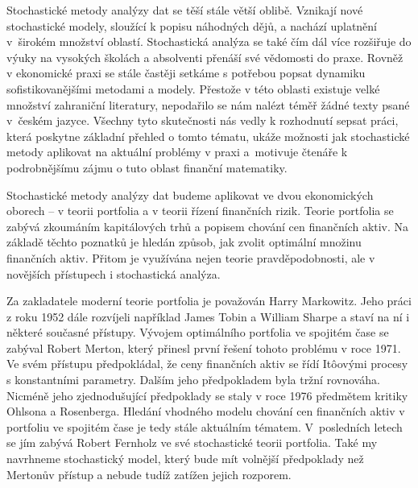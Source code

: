 \documentclass[a4paper,12pt]{report}
\theoremstyle{definition} \newtheorem{definice}[veta]{Definice}
\theoremstyle{remark}
\begin{document}

Stochastické metody analýzy dat se těší stále větší oblibě.
Vznikají nové stochastické modely, sloužící k popisu náhodných dějů, a nachází uplatnění v~širokém množství oblastí.
Stochastická analýza se také čím dál více rozšiřuje do výuky na vysokých školách a absolventi přenáší své vědomosti do praxe.
Rovněž v ekonomické praxi se stále častěji setkáme s potřebou popsat dynamiku sofistikovanějšími metodami a modely.
Přestože v této oblasti existuje velké množství zahraniční literatury, nepodařilo se nám nalézt téměř žádné texty psané v~českém jazyce.
Všechny tyto skutečnosti nás vedly k rozhodnutí sepsat práci, která poskytne základní přehled o tomto tématu, ukáže možnosti jak stochastické metody aplikovat na aktuální problémy v praxi a~motivuje čtenáře k podrobnějšímu zájmu o tuto oblast finanční matematiky.

Stochastické metody analýzy dat budeme aplikovat ve dvou ekonomických oborech -- v teorii portfolia a v teorii řízení finančních rizik. 
Teorie portfolia se zabývá zkoumáním kapitálových trhů a popisem chování cen finančních aktiv.
Na základě těchto poznatků je hledán způsob, jak zvolit optimální množinu finančních aktiv.
Přitom je využívána nejen teorie pravděpodobnosti, ale v novějších přístupech i stochastická analýza.

Za zakladatele moderní teorie portfolia je považován Harry Markowitz. 
Jeho práci z roku 1952 dále rozvíjeli například James Tobin a William Sharpe a staví na ní i některé současné přístupy.
%
%
Vývojem optimálního portfolia ve spojitém čase se zabýval Robert Merton, který přinesl první řešení tohoto problému v roce 1971.
Ve svém přístupu předpokládal, že ceny finančních aktiv se řídí It\^oovými procesy s konstantními parametry. 
Dalším jeho předpokladem byla tržní rovnováha.
%
Nicméně jeho zjednodušující předpoklady se staly v roce 1976 předmětem kritiky Ohlsona a Rosenberga.
Hledání vhodného modelu chování cen finančních aktiv v portfoliu ve spojitém čase je tedy stále aktuálním tématem. 
V~posledních letech se jím zabývá Robert Fernholz ve své stochastické teorii portfolia. 
Také my navrhneme stochastický model, který bude mít volnější předpoklady než Mertonův přístup a nebude tudíž zatížen jejich rozporem.
\end{document}

